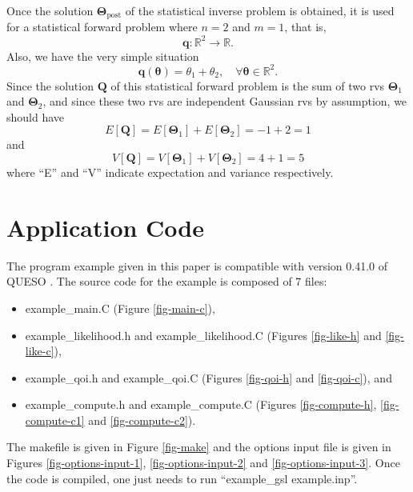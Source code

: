 Once the solution $\boldsymbol{\Theta}_{\text{post}}$ of the statistical inverse problem is obtained,
it is used for a statistical forward problem where $n=2$ and $m=1$, that is,
\begin{equation*}
\mathbf{q}:\mathbb{R}^2\rightarrow\mathbb{R}.
\end{equation*}
Also, we have the very simple situation
\begin{equation}\label{eq-example-q}
\mathbf{q}(\boldsymbol{\theta}) = \theta_1+\theta_2,\quad\forall\boldsymbol{\theta}\in\mathbb{R}^2.
\end{equation}
Since the solution $\mathbf{Q}$ of this statistical forward problem is the sum of
two rvs $\boldsymbol{\Theta}_1$ and $\boldsymbol{\Theta}_2$,
and since these two rvs are independent Gaussian rvs by assumption, we should have
\begin{equation}\label{eq-example-E}
E[\mathbf{Q}] = E[\boldsymbol{\Theta}_1] + E[\boldsymbol{\Theta}_2] = -1 + 2 = 1
\end{equation}
and
\begin{equation}\label{eq-example-V}
V[\mathbf{Q}] = V[\boldsymbol{\Theta}_1] + V[\boldsymbol{\Theta}_2] = 4 + 1 = 5
\end{equation}
where ``E'' and ``V'' indicate expectation and variance respectively.

\clearpage
\section{Application Code}

The program example given in this paper is compatible with version 0.41.0 of QUESO \cite{Pr09c}.
The source code for the example is composed of 7 files:
\begin{itemize}
\item example\_main.C (Figure \ref{fig-main-c}),
\item example\_likelihood.h and example\_likelihood.C (Figures \ref{fig-like-h} and \ref{fig-like-c}),
\item example\_qoi.h and example\_qoi.C (Figures \ref{fig-qoi-h} and \ref{fig-qoi-c}), and
\item example\_compute.h and example\_compute.C (Figures \ref{fig-compute-h}, \ref{fig-compute-c1} and \ref{fig-compute-c2}).
\end{itemize}
The makefile is given in Figure \ref{fig-make} and the options input file is given in Figures \ref{fig-options-input-1}, \ref{fig-options-input-2} and \ref{fig-options-input-3}.
Once the code is compiled, one just needs to run ``example\_gsl example.inp''.

